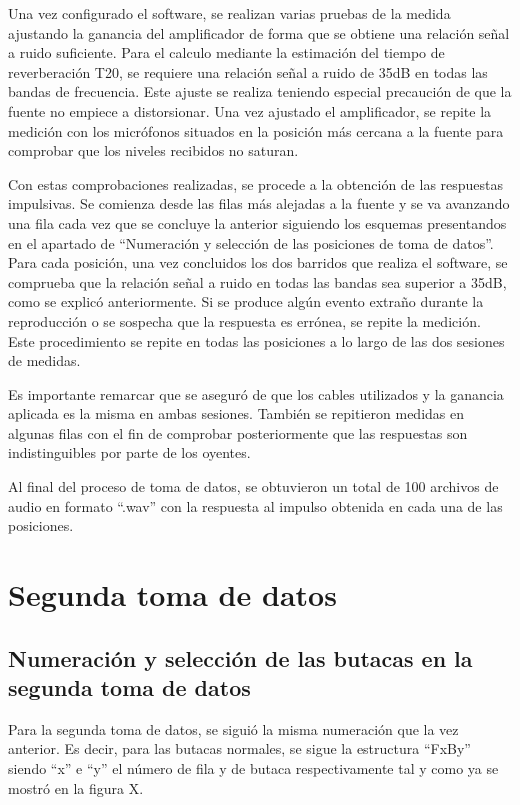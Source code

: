 \documentclass[11pt,a4paper,twoside]{book}
\begin{document}
            Una vez configurado el software, se realizan varias pruebas de la medida ajustando la ganancia del amplificador de forma que se obtiene una relación señal a ruido suficiente. Para el calculo mediante la estimación del tiempo de reverberación T20, se requiere una relación señal a ruido de 35dB en todas las bandas de frecuencia. Este ajuste se realiza teniendo especial precaución de que la fuente no empiece a distorsionar. Una vez ajustado el amplificador, se repite la medición con los micrófonos situados en la posición más cercana a la fuente para comprobar que los niveles recibidos no saturan.
        
            Con estas comprobaciones realizadas, se procede a la obtención de las respuestas impulsivas. Se comienza desde las filas más alejadas a la fuente y se va avanzando una fila cada vez que se concluye la anterior siguiendo los esquemas presentandos en el apartado de ``Numeración y selección de las posiciones de toma de datos''. Para cada posición, una vez concluidos los dos barridos que realiza el software, se comprueba que la relación señal a ruido en todas las bandas sea superior a 35dB, como se explicó anteriormente. Si se produce algún evento extraño durante la reproducción o se sospecha que la respuesta es errónea, se repite la medición. Este procedimiento se repite en todas las posiciones a lo largo de las dos sesiones de medidas.
        
            Es importante remarcar que se aseguró de que los cables utilizados y la ganancia aplicada es la misma en ambas sesiones. También se repitieron medidas en algunas filas con el fin de comprobar posteriormente que las respuestas son indistinguibles por parte de los oyentes.
        
            Al  final del proceso de toma de datos, se obtuvieron un total de 100 archivos de audio en formato ``.wav'' con la respuesta al impulso obtenida en cada una de las posiciones.
            
    \section{Segunda toma de datos}
        
       \subsection{Numeración y selección de las butacas en la segunda toma de datos}
            Para la segunda toma de datos, se siguió la misma numeración que la vez anterior. Es decir, para las butacas normales, se sigue la estructura ``FxBy'' siendo ``x'' e ``y'' el número de fila y de butaca respectivamente tal y como ya se mostró en la figura X.
                
\end{document}
